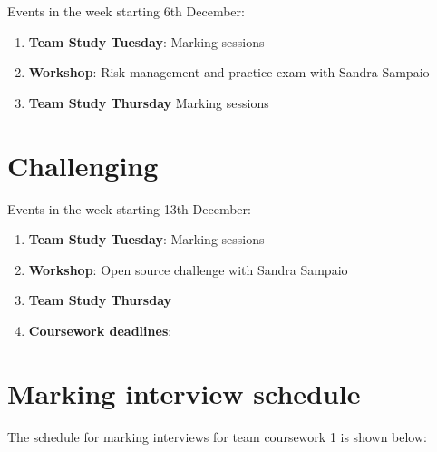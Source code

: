 \documentclass[
]{book}
\providecommand{\tightlist}{%
  \setlength{\itemsep}{0pt}\setlength{\parskip}{0pt}}
\begin{document}
Events in the week starting 6th December:

\begin{enumerate}
\def\labelenumi{\arabic{enumi}.}
\tightlist
\item
  \textbf{Team Study Tuesday}: Marking sessions
\item
  \textbf{Workshop}: Risk management and practice exam with Sandra Sampaio
\item
  \textbf{Team Study Thursday} Marking sessions
\end{enumerate}

\hypertarget{week12}{%
\section{Challenging}\label{week12}}

Events in the week starting 13th December:

\begin{enumerate}
\def\labelenumi{\arabic{enumi}.}
\tightlist
\item
  \textbf{Team Study Tuesday}: Marking sessions
\item
  \textbf{Workshop}: Open source challenge with Sandra Sampaio
\item
  \textbf{Team Study Thursday}
\item
  \textbf{Coursework deadlines}:
\end{enumerate}

\hypertarget{mint}{%
\section{Marking interview schedule}\label{mint}}

The schedule for marking interviews for team coursework 1 is shown below:
\end{document}
